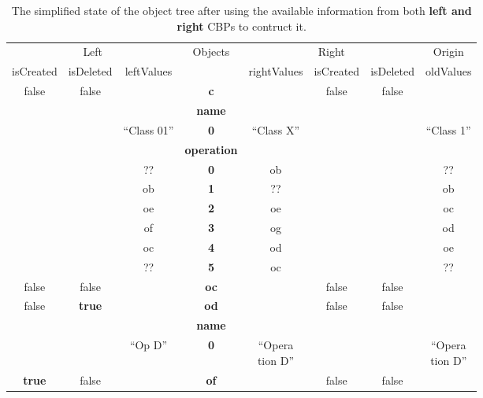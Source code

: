 \documentclass{llncs}
\begin{document}
\begin{table}
    \centering
    \begin{footnotesize}
        \caption{The simplified state of the object tree after using the available information from both \textbf{left and right} CBPs to contruct it.}
        \label{table:right_object_tree}
        \begin{tabular}{  c  c  c  c  c  c  c  c  }
            \hline
            \multicolumn{3}{c}{Left} & \multirow{2}{*}{Objects} & \multicolumn{3}{c}{Right} & Origin\\
            \hhline{---~----}
            isCreated & isDeleted & leftValues & & rightValues & isCreated & isDeleted & oldValues\\
            \hline
            \rowcolor{gray1}
            false & false & & \textbf{\textsf{c}} & & false & false & \\
            \rowcolor{gray2}
            & & & \textbf{\textsf{name}} & & & & \\
            & & ``Class 01'' & \textbf{0} & ``Class X'' & & & ``Class 1'' \\
            \rowcolor{gray2}
            & & & \textbf{\textsf{operation}} & & & & \\
            & & ?? & \textbf{\small{0}} & ob & & & ?? \\
            & & ob & \textbf{\small{1}} & ?? & & & ob \\
            & & oe & \textbf{\small{2}} & oe & & & oc \\
            & & of & \textbf{\small{3}} & og & & & od \\
            & & oc & \textbf{\small{4}} & od & & & oe \\
            & & ?? & \textbf{\small{5}} & oc & & & ?? \\
            \hline
            \rowcolor{gray1}
            false & false & & \textbf{\textsf{oc}} & & false & false & \\
            \hline
            \rowcolor{gray1}
            false & \textbf{true} & & \textbf{\textsf{od}} & & false & false & \\
            \rowcolor{gray2}
            & & & \textbf{\textsf{name}} & & & & \\
            & & ``Op D'' & \textbf{0} & \makecell{``Opera\\tion D''} & & & \makecell{``Opera\\tion D''} \\
            \hline
            \rowcolor{gray1}
            \textbf{true} & false & & \textbf{\textsf{of}} & & false & false & \\

\end{tabular}
\end{footnotesize}
\end{table}
\end{document}
